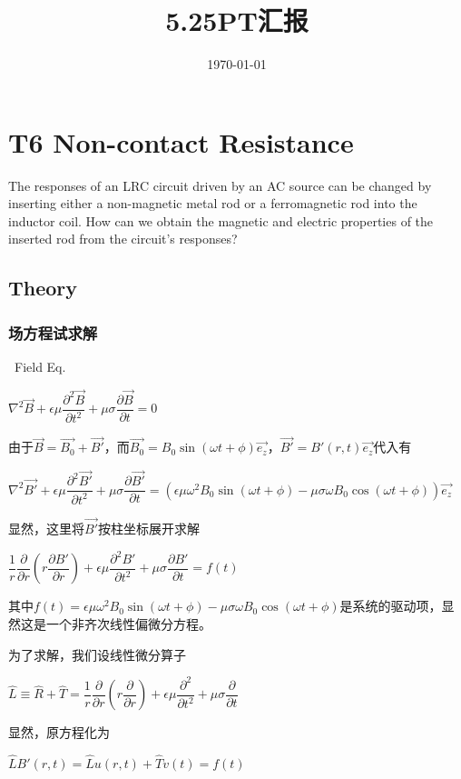 \documentclass[11pt]{beamer}                                                                                               \usetheme{Boadilla}
\begin{document}
	\title[PT Summary]{5.25PT汇报}
	\author[Tang Yi]{} %
	\institute[]{} %
	\date{\today}  %
	\begin{frame}
		\titlepage
	\end{frame}
	\section{T6 Non-contact Resistance}
	
	\begin{frame}
		\sectionpage
		The responses of an LRC circuit driven by an AC source can be changed by inserting either a non-magnetic metal rod or a ferromagnetic rod into the inductor coil. How can we obtain the magnetic and electric properties of the inserted rod from the circuit's responses?
	\end{frame}
	\subsection{Theory}
	\begin{frame}[fragile]
		\frametitle{场方程试求解}
		 \begin{block}{\,\,\,Field Eq. }
			\centerline{$\nabla^2 \vec{B}+\epsilon \mu \dfrac{\partial^2 \vec{B}}{\partial t^2}+\mu \sigma \dfrac{\partial \vec{B}}{\partial t}=0$}
		\end{block}
		由于$\vec{B}=\vec{B_0}+\vec{B'}$，而$\vec{B_0}=B_0 \sin(\omega t+ \phi) \vec{e_z}$，$\vec{B'}=B'(r,t) \vec{e_z}$代入有
		
		\centerline{$\nabla^2 \vec{B'}+\epsilon\mu\dfrac{\partial^2 \vec{B'}}{\partial t^2}+\mu \sigma \dfrac{\partial \vec{B'}}{\partial t}=\left(\epsilon \mu\omega^2 B_0 \sin(\omega t+\phi)-\mu \sigma \omega B_0 \cos(\omega t+\phi)\right)\vec{e_z}$}
		
		显然，这里将$\vec{B'}$按柱坐标展开求解
		
		\centerline{$\dfrac{1}{r}\dfrac{\partial}{\partial r}\left(r\dfrac{\partial B'}{\partial r}\right)+\epsilon\mu\dfrac{\partial^2 {B'}}{\partial t^2}+\mu \sigma \dfrac{\partial{B'}}{\partial t}=f(t)$}
		
		其中$f(t)=\epsilon \mu\omega^2 B_0 \sin(\omega t+\phi)-\mu \sigma \omega B_0 \cos(\omega t+\phi)$是系统的驱动项，显然这是一个非齐次线性偏微分方程。
		
		为了求解，我们设线性微分算子
		
		\centerline{$\hat{L}\equiv\hat{R}+\hat{T}=\dfrac{1}{r}\dfrac{\partial}{\partial r}\left(r\dfrac{\partial}{\partial r}\right)+\epsilon\mu\dfrac{\partial^2}{\partial t^2}+\mu \sigma \dfrac{\partial}{\partial t}$}
		
		显然，原方程化为
		
		\centerline{$\hat{L}B'(r,t)=\hat{L}u(r,t)+\hat{T}v(t)=f(t)$}
	\end{frame}
\end{document}
